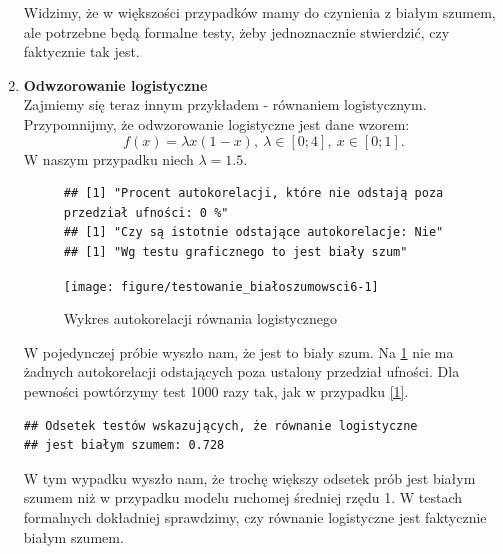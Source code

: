 \documentclass[10pt, a4paper]{article}\usepackage[]{graphicx}\usepackage[]{xcolor}
\makeatletter
\newenvironment{kframe}{%
 \def\at@end@of@kframe{}%
 \ifinner\ifhmode%
  \def\at@end@of@kframe{\end{minipage}}%
  \begin{minipage}{\columnwidth}%
 \fi\fi%
 \def\FrameCommand##1{\hskip\@totalleftmargin \hskip-\fboxsep
 \colorbox{shadecolor}{##1}\hskip-\fboxsep
     \hskip-\linewidth \hskip-\@totalleftmargin \hskip\columnwidth}%
 \MakeFramed {\advance\hsize-\width
   \@totalleftmargin\z@ \linewidth\hsize
   \@setminipage}}%
 {\par\unskip\endMakeFramed%
 \at@end@of@kframe}
\newenvironment{knitrout}{}{} %
\makeatother
\begin{document}
\begin{enumerate}
Widzimy, że w większości przypadków mamy do czynienia z białym szumem, ale potrzebne będą formalne testy, żeby jednoznacznie stwierdzić, czy faktycznie tak jest.
\item \textbf{Odwzorowanie logistyczne} \\
Zajmiemy się teraz innym przykładem - równaniem logistycznym. Przypomnijmy, że odwzorowanie logistyczne jest dane wzorem:
$$f(x)=\lambda x(1-x),~\lambda\in[0;4],~x\in[0;1].$$
W naszym przypadku niech $\lambda=1.5$.
\begin{figure}[H]
\begin{knitrout}
\color{fgcolor}\begin{kframe}
\begin{verbatim}
## [1] "Procent autokorelacji, które nie odstają poza przedział ufności: 0 %"
## [1] "Czy są istotnie odstające autokorelacje: Nie"
## [1] "Wg testu graficznego to jest biały szum"
\end{verbatim}
\end{kframe}

{\centering \texttt{[image: figure/testowanie\_białoszumowsci6-1]} 

}


\end{knitrout}
\caption{Wykres autokorelacji równania logistycznego}
\label{graph3}
\end{figure}
W pojedynczej próbie wyszło nam, że jest to biały szum. Na \ref{graph3} nie ma żadnych autokorelacji odstających poza ustalony przedział ufności. Dla pewności powtórzymy test 1000 razy tak, jak w przypadku \ref{1}.
\begin{knitrout}
\color{fgcolor}\begin{kframe}
\begin{verbatim}
## Odsetek testów wskazujących, że równanie logistyczne
## jest białym szumem: 0.728
\end{verbatim}
\end{kframe}
\end{knitrout}
W tym wypadku wyszło nam, że trochę większy odsetek prób jest białym szumem niż w przypadku modelu ruchomej średniej rzędu 1. W testach formalnych dokładniej sprawdzimy, czy równanie logistyczne jest faktycznie białym szumem.
\end{enumerate}
\end{document}
